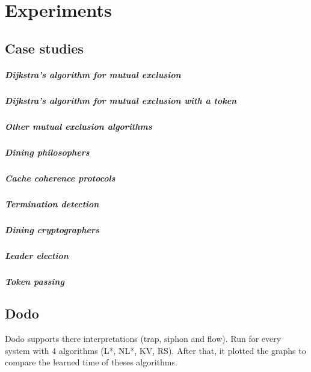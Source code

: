 \chapter{Experiments}\label{chapter:experiment}

\section{Case studies}
\paragraph{Dijkstra’s algorithm for mutual exclusion}
\paragraph{Dijkstra’s algorithm for mutual exclusion with a token}
\paragraph{Other mutual exclusion algorithms}
\paragraph{Dining philosophers}
\paragraph{Cache coherence protocols}
\paragraph{Termination detection}
\paragraph{Dining cryptographers}
\paragraph{Leader election}
\paragraph{Token passing}

\section{Dodo}
Dodo supports there interpretations (trap, siphon and flow).
Run for every system with  4 algorithms (L*, NL*, KV, RS). 
After that, it plotted the graphs to compare the learned time 
of theses algorithms.

